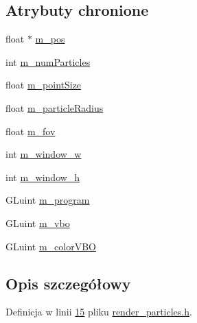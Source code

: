 \subsection*{Atrybuty chronione}
\begin{DoxyCompactItemize}
\item 
float $\ast$ \hyperlink{class_particle_renderer_a1d74720edb5c3a13edcdd176ac0d84c7}{m\-\_\-pos}
\item 
int \hyperlink{class_particle_renderer_af885fdb5e6da925209dfd960f66b5fd8}{m\-\_\-num\-Particles}
\item 
float \hyperlink{class_particle_renderer_a1ca13e546c937cb546c0da19fa853b34}{m\-\_\-point\-Size}
\item 
float \hyperlink{class_particle_renderer_aab5ee3cd769a64c45dc9714aabdb0ee2}{m\-\_\-particle\-Radius}
\item 
float \hyperlink{class_particle_renderer_a0aed003bd557a3c32ca7d2ca89fc59f7}{m\-\_\-fov}
\item 
int \hyperlink{class_particle_renderer_aa71b7eba5d5665a086b7ba80adddf19b}{m\-\_\-window\-\_\-w}
\item 
int \hyperlink{class_particle_renderer_af34b1e93f6a7f22774a6473c52027d77}{m\-\_\-window\-\_\-h}
\item 
G\-Luint \hyperlink{class_particle_renderer_ab8f0dd1a6e0f4401012bd46ae8940648}{m\-\_\-program}
\item 
G\-Luint \hyperlink{class_particle_renderer_a7549feaa0982abbc44c9fe73f2eb251f}{m\-\_\-vbo}
\item 
G\-Luint \hyperlink{class_particle_renderer_a7dcaa73a41c598207974432206b423b5}{m\-\_\-color\-V\-B\-O}
\end{DoxyCompactItemize}


\subsection{Opis szczegółowy}


Definicja w linii \hyperlink{render__particles_8h_source_l00015}{15} pliku \hyperlink{render__particles_8h_source}{render\-\_\-particles.\-h}.



